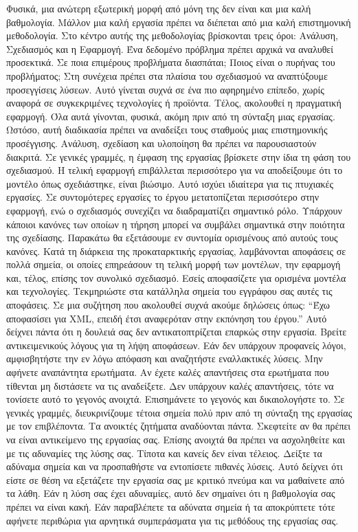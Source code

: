 Φυσικά, μια ανώτερη εξωτερική μορφή από μόνη της δεν είναι και μια καλή βαθμολογία.
Μάλλον μια καλή εργασία πρέπει να διέπεται από μια καλή επιστημονική μεθοδολογία. Στο κέντρο αυτής της μεθοδολογίας βρίσκονται τρεις όροι: Ανάλυση, Σχεδιασμός και η Εφαρμογή.
Ένα δεδομένο πρόβλημα πρέπει αρχικά να αναλυθεί προσεκτικά. Σε ποια επιμέρους προβλήματα διασπάται; Ποιος είναι ο πυρήνας του προβλήματος; Στη συνέχεια πρέπει  στα πλαίσια του σχεδιασμού να αναπτύξουμε προσεγγίσεις λύσεων. Αυτό γίνεται συχνά σε ένα πιο αφηρημένο επίπεδο, χωρίς αναφορά σε συγκεκριμένες τεχνολογίες ή προϊόντα. Τέλος, ακολουθεί η πραγματική εφαρμογή. Όλα αυτά γίνονται, φυσικά, ακόμη πριν από τη σύνταξη μιας εργασίας. Ωστόσο, αυτή διαδικασία πρέπει να αναδείξει τους σταθμούς μιας επιστημονικής προσέγγισης. Ανάλυση, σχεδίαση και υλοποίηση θα πρέπει να παρουσιαστούν διακριτά. Σε γενικές γραμμές, η έμφαση της εργασίας βρίσκετε στην ίδια τη φάση του σχεδιασμού. 
Η τελική εφαρμογή επιβάλλεται περισσότερο για να αποδείξουμε ότι το μοντέλο όπως σχεδιάστηκε, είναι βιώσιμο. Αυτό ισχύει ιδιαίτερα για τις πτυχιακές εργασίες. Σε συντομότερες εργασίες το έργου μετατοπίζεται περισσότερο στην εφαρμογή, ενώ ο σχεδιασμός συνεχίζει να διαδραματίζει σημαντικό ρόλο.
Υπάρχουν κάποιοι κανόνες των οποίων η τήρηση μπορεί να συμβάλει σημαντικά στην ποιότητα της σχεδίασης. Παρακάτω θα εξετάσουμε εν συντομία ορισμένους από αυτούς τους κανόνες.
Κατά τη διάρκεια της προκαταρκτικής εργασίας, λαμβάνονται αποφάσεις σε πολλά σημεία, οι οποίες επηρεάσουν τη τελική μορφή των μοντέλων, την εφαρμογή και, τέλος, επίσης τον συνολικό σχεδιασμό. Εσείς αποφασίζετε για ορισμένα μοντέλα και τεχνολογίες. Τεκμηριώστε στα κατάλληλα σημεία του εγγράφου σας αυτές τις αποφάσεις.
Σε μια συζήτηση που ακολουθεί συχνά ακούμε δηλώσεις όπως:
``Έχω αποφασίσει για XML, επειδή έτσι αναφερόταν στην εκπόνηση του έργου.''
Αυτό δείχνει πάντα ότι η δουλειά σας δεν αντικατοπτρίζεται επαρκώς στην εργασία. 
Βρείτε αντικειμενικούς λόγους για τη λήψη αποφάσεων. Εάν δεν υπάρχουν προφανείς λόγοι, αμφισβητήστε την εν λόγω απόφαση και αναζητήστε εναλλακτικές λύσεις.
Μην αφήνετε αναπάντητα ερωτήματα. Αν έχετε καλές απαντήσεις στα ερωτήματα που τίθενται μη διστάσετε να τις αναδείξετε. Δεν υπάρχουν καλές απαντήσεις, τότε να τονίσετε αυτό το γεγονός ανοιχτά. Επισημάνετε το γεγονός και δικαιολογήστε το. Σε γενικές γραμμές, διευκρινίζουμε τέτοια σημεία πολύ πριν από τη σύνταξη της εργασίας με τον επιβλέποντα. Τα ανοικτές ζητήματα αναδύονται πάντα. Σκεφτείτε αν θα πρέπει να είναι αντικείμενο της εργασίας σας.
Επίσης ανοιχτά θα πρέπει να ασχοληθείτε και με τις αδυναμίες της λύσης σας. Τίποτα  και κανείς δεν είναι τέλειος. Δείξτε τα αδύναμα σημεία και να προσπαθήστε να εντοπίσετε πιθανές λύσεις. Αυτό δείχνει ότι είστε σε θέση να εξετάζετε την εργασία σας με κριτικό πνεύμα και να μαθαίνετε από τα λάθη. Εάν η λύση σας έχει αδυναμίες, αυτό δεν σημαίνει ότι η βαθμολογία σας πρέπει να είναι κακή. Εάν παραβλέπετε τα αδύνατα σημεία ή τα αποκρύπτετε τότε αφήνετε περιθώρια για αρνητικά συμπεράσματα για τις μεθόδους της εργασίας σας.
